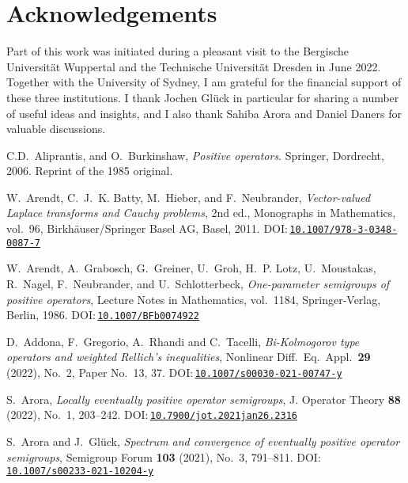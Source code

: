 \documentclass[a4paper, reqno]{amsart}
\numberwithin{equation}{section}
\theoremstyle{plain}
\theoremstyle{definition}
\theoremstyle{remark}
\begin{document}
\section*{Acknowledgements}
Part of this work was initiated during a pleasant visit to the Bergische Universit\"{a}t Wuppertal and the Technische Universit\"{a}t Dresden in June 2022. Together with the University of Sydney, I am grateful for the financial support of these three institutions. I thank Jochen Gl\"{u}ck in particular for sharing a number of useful ideas and insights, and I also thank Sahiba Arora and Daniel Daners for valuable discussions.

\begin{thebibliography}{10}
	C.D.~Aliprantis, and O.~Burkinshaw, \emph{Positive operators}. Springer, Dordrecht, 2006. Reprint of the 1985 original.
	
	W.~Arendt, C.~J.~K. Batty, M.~Hieber, and F.~Neubrander, \emph{Vector-valued
		Laplace transforms and Cauchy problems}, 2nd ed., Monographs in
	Mathematics, vol.~96, Birkh\"{a}user/Springer Basel AG, Basel, 2011.
	DOI:\,\href{https://doi.org/10.1007/978-3-0348-0087-7}{\nolinkurl{10.1007/978-3-0348-0087-7}}
	
	W.~Arendt, A.~Grabosch, G.~Greiner, U.~Groh, H.~P. Lotz, U.~Moustakas,
	R.~Nagel, F.~Neubrander, and U.~Schlotterbeck, \emph{One-parameter semigroups
		of positive operators}, Lecture Notes in Mathematics, vol.~1184,
	Springer-Verlag, Berlin, 1986.
	DOI:\,\href{https://doi.org/10.1007/BFb0074922}{\nolinkurl{10.1007/BFb0074922}}
	
	D.~Addona, F.~Gregorio, A.~Rhandi and C.~Tacelli, \emph{Bi-Kolmogorov type operators and weighted Rellich's inequalities},
	Nonlinear Diff.~Eq.~Appl.~\textbf{29} (2022), No.~2, Paper No.~13, 37.
	DOI:\,\href{https://doi.org/10.1007/s00030-021-00747-y}{\nolinkurl{10.1007/s00030-021-00747-y}}
	
	S.~Arora, \emph{Locally eventually positive operator semigroups},
	J. Operator Theory \textbf{88} (2022), No.~1, 203--242.
	DOI:\,\href{https://dx.doi.org/10.7900/jot.2021jan26.2316}{\nolinkurl{10.7900/jot.2021jan26.2316}}
	
	S.~Arora and J.~Gl\"{u}ck, \emph{Spectrum and convergence of eventually positive operator semigroups}, 
	Semigroup Forum \textbf{103} (2021), No.~3, 791--811.
	DOI:\,\href{https://doi.org/10.1007/s00233-021-10204-y}{\nolinkurl{10.1007/s00233-021-10204-y}}
	

\end{thebibliography}
\end{document}
